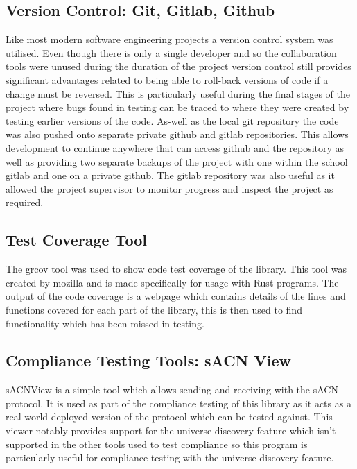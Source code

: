 \documentclass[11pt,a4paper]{report}
\begin{document}
\subsection{Version Control: Git, Gitlab, Github}
Like most modern software engineering projects a version control system was utilised. Even though there is only a single developer and so the collaboration tools were unused during the duration of the project version control still provides significant advantages related to being able to roll-back versions of code if a change must be reversed. This is particularly useful during the final stages of the project where bugs found in testing can be traced to where they were created by testing earlier versions of the code. As-well as the local git repository the code was also pushed onto separate private github and gitlab repositories. This allows development to continue anywhere that can access github and the repository as well as providing two separate backups of the project with one within the school gitlab and one on a private github. The gitlab repository was also useful as it allowed the project supervisor to monitor progress and inspect the project as required.

\subsection{Test Coverage Tool}
The grcov \cite{GRCOV} tool was used to show code test coverage of the library. This tool was created by mozilla and is made specifically for usage with Rust programs. The output of the code coverage is a webpage which contains details of the lines and functions covered for each part of the library, this is then used to find functionality which has been missed in testing. 

\subsection{Compliance Testing Tools: sACN View}
sACNView \cite{SACN_VIEW} is a simple tool which allows sending and receiving with the sACN protocol. It is used as part of the compliance testing of this library as it acts as a real-world deployed version of the protocol which can be tested against. This viewer notably provides support for the universe discovery feature which isn't supported in the other tools used to test compliance so this program is particularly useful for compliance testing with the universe discovery feature.\\
\end{document}
